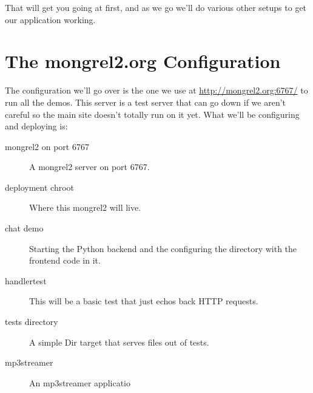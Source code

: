 That will get you going at first, and as we go we'll do various other setups to 
get our application working.


\section{The mongrel2.org Configuration}

The configuration we'll go over is the one we use at \url{http://mongrel2.org:6767/}
to run all the demos.  This server is a test server that can go down if we aren't 
careful so the main site doesn't totally run on it yet.  What we'll be configuring
and deploying is:

\begin{description}
\item [mongrel2 on port 6767] A mongrel2 server on port 6767.
\item [deployment chroot] Where this mongrel2 will live.
\item [chat demo] Starting the Python backend and the configuring the directory with the
    frontend code in it.
\item [handlertest] This will be a basic test that just echos back HTTP requests.
\item [tests directory] A simple Dir target that serves files out of tests.
\item [mp3streamer] An mp3streamer applicatio
\end{description}



